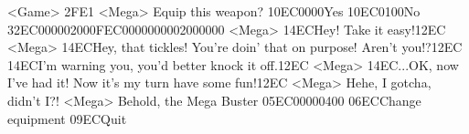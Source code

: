 <Game> {2F}{E1}
<Mega> Equip this weapon? {10}{EC}{00}{00}Yes {10}{EC}{01}{00}No {32}{EC}{00}{00}{02}{00}{0F}{EC}{00}{00}{00}{00}{02}{00}{00}{00}
<Mega> {14}{EC}Hey! Take it easy!{12}{EC} 
<Mega> {14}{EC}Hey, that tickles! You're doin' that on purpose! Aren't you!?{12}{EC} 
{14}{EC}I'm warning you, you'd better knock it off.{12}{EC} 
<Mega> {14}{EC}...OK, now I've had it! Now it's my turn have some fun!{12}{EC} 
<Mega> Hehe, I gotcha, didn't I?! 
<Mega> Behold, the Mega Buster {05}{EC}{00}{00}{04}{00}  {06}{EC}Change equipment   {09}{EC}Quit 
